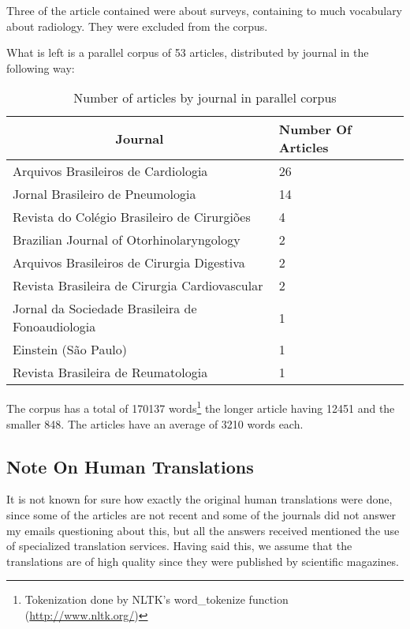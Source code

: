 Three of the article contained were about surveys, containing to much vocabulary about radiology. They were excluded from the corpus.

What is left is a parallel corpus of 53 articles, distributed by journal in the following way:

\begin{table}[ht]
\centering
\caption{Number of articles by journal in parallel corpus}
\label{table:articles_by_journal}
\begin{tabular}{@{}ll@{}}
\toprule
\multicolumn{1}{c}{\textbf{Journal}}                 & \textbf{Number Of Articles} \\ \midrule
Arquivos Brasileiros de Cardiologia         & 26                          \\
Jornal Brasileiro de Pneumologia            & 14                          \\
Revista do Colégio Brasileiro de Cirurgiões & 4                           \\
Brazilian Journal of Otorhinolaryngology    & 2                           \\
Arquivos Brasileiros de Cirurgia Digestiva  & 2                           \\
Revista Brasileira de Cirurgia Cardiovascular        & 2                           \\
Jornal da Sociedade Brasileira de Fonoaudiologia     & 1                           \\
Einstein (São Paulo)                                 & 1                           \\
Revista Brasileira de Reumatologia                   & 1                           \\ \bottomrule
\end{tabular}
\end{table}

The corpus has a total of 170137 words\footnote{Tokenization done by NLTK's word\_tokenize function (\url{http://www.nltk.org/})} the longer article having 12451 and the smaller 848. The articles have an average of 3210 words each. 

\subsection{Note On Human Translations}

It is not known for sure how exactly the original human translations were done, since some of the articles are not recent and some of the journals did not answer my emails questioning about this, but all the answers received mentioned the use of specialized translation services. Having said this, we assume that the translations are of high quality since they were published by scientific magazines. 

